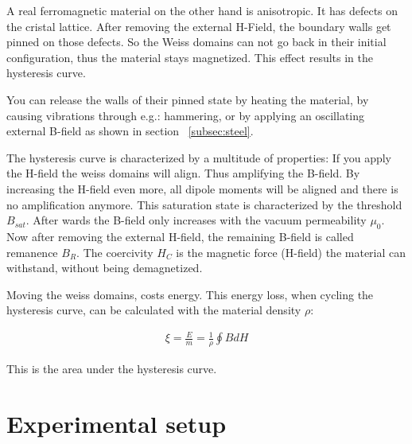 \documentclass[a4paper,10pt,twocolumn]{article}
\begin{document}
    A real ferromagnetic material on the other hand is anisotropic.
    It has defects on the cristal lattice.
    After removing the external H-Field, the boundary walls get pinned on those defects.
    So the Weiss domains can not go back in their initial configuration, thus the material stays magnetized.
    This effect results in the hysteresis curve.
    
    You can release the walls of their pinned state by heating the material, by causing vibrations through e.g.: hammering,  
    or by applying an oscillating external B-field as shown in section ~\ref{subsec:steel}.
    
    The hysteresis curve is characterized by a multitude of properties:
    If you apply the H-field the weiss domains will align.
    Thus amplifying the B-field. 
    By increasing the H-field even more, all dipole moments will be aligned and there is no amplification anymore.
    This saturation state is characterized by the threshold $B_{sat}$.
    After wards the B-field only increases with the vacuum permeability $\mu_0$.
    Now after removing the external H-field, the remaining B-field is called remanence $B_{R}$.
    The coercivity $H_C$ is the magnetic force (H-field) the material can withstand, without being demagnetized.
    
    Moving the weiss domains, costs energy.
    This energy loss, when cycling the hysteresis curve, can be calculated with the material density $\rho$:
    
    \begin{align}
        \label{eq:EnergyLoss}
        \xi = \frac{E}{m} = \frac{1}{\rho} \oint{B dH}
    \end{align}
    
    This is the area under the hysteresis curve.
    
    \section{Experimental setup}
    
\end{document}
